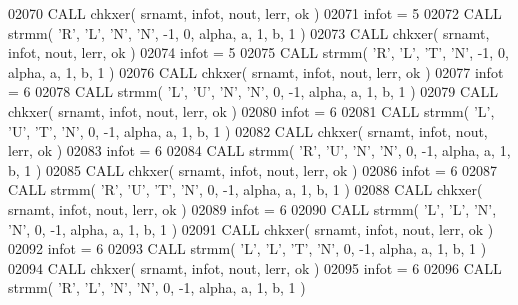 \begin{DoxyCode}
02070       \textcolor{keyword}{CALL }chkxer( srnamt, infot, nout, lerr, ok )
02071       infot = 5
02072       \textcolor{keyword}{CALL }strmm( \textcolor{stringliteral}{'R'}, \textcolor{stringliteral}{'L'}, \textcolor{stringliteral}{'N'}, \textcolor{stringliteral}{'N'}, -1, 0, alpha, a, 1, b, 1 )
02073       \textcolor{keyword}{CALL }chkxer( srnamt, infot, nout, lerr, ok )
02074       infot = 5
02075       \textcolor{keyword}{CALL }strmm( \textcolor{stringliteral}{'R'}, \textcolor{stringliteral}{'L'}, \textcolor{stringliteral}{'T'}, \textcolor{stringliteral}{'N'}, -1, 0, alpha, a, 1, b, 1 )
02076       \textcolor{keyword}{CALL }chkxer( srnamt, infot, nout, lerr, ok )
02077       infot = 6
02078       \textcolor{keyword}{CALL }strmm( \textcolor{stringliteral}{'L'}, \textcolor{stringliteral}{'U'}, \textcolor{stringliteral}{'N'}, \textcolor{stringliteral}{'N'}, 0, -1, alpha, a, 1, b, 1 )
02079       \textcolor{keyword}{CALL }chkxer( srnamt, infot, nout, lerr, ok )
02080       infot = 6
02081       \textcolor{keyword}{CALL }strmm( \textcolor{stringliteral}{'L'}, \textcolor{stringliteral}{'U'}, \textcolor{stringliteral}{'T'}, \textcolor{stringliteral}{'N'}, 0, -1, alpha, a, 1, b, 1 )
02082       \textcolor{keyword}{CALL }chkxer( srnamt, infot, nout, lerr, ok )
02083       infot = 6
02084       \textcolor{keyword}{CALL }strmm( \textcolor{stringliteral}{'R'}, \textcolor{stringliteral}{'U'}, \textcolor{stringliteral}{'N'}, \textcolor{stringliteral}{'N'}, 0, -1, alpha, a, 1, b, 1 )
02085       \textcolor{keyword}{CALL }chkxer( srnamt, infot, nout, lerr, ok )
02086       infot = 6
02087       \textcolor{keyword}{CALL }strmm( \textcolor{stringliteral}{'R'}, \textcolor{stringliteral}{'U'}, \textcolor{stringliteral}{'T'}, \textcolor{stringliteral}{'N'}, 0, -1, alpha, a, 1, b, 1 )
02088       \textcolor{keyword}{CALL }chkxer( srnamt, infot, nout, lerr, ok )
02089       infot = 6
02090       \textcolor{keyword}{CALL }strmm( \textcolor{stringliteral}{'L'}, \textcolor{stringliteral}{'L'}, \textcolor{stringliteral}{'N'}, \textcolor{stringliteral}{'N'}, 0, -1, alpha, a, 1, b, 1 )
02091       \textcolor{keyword}{CALL }chkxer( srnamt, infot, nout, lerr, ok )
02092       infot = 6
02093       \textcolor{keyword}{CALL }strmm( \textcolor{stringliteral}{'L'}, \textcolor{stringliteral}{'L'}, \textcolor{stringliteral}{'T'}, \textcolor{stringliteral}{'N'}, 0, -1, alpha, a, 1, b, 1 )
02094       \textcolor{keyword}{CALL }chkxer( srnamt, infot, nout, lerr, ok )
02095       infot = 6
02096       \textcolor{keyword}{CALL }strmm( \textcolor{stringliteral}{'R'}, \textcolor{stringliteral}{'L'}, \textcolor{stringliteral}{'N'}, \textcolor{stringliteral}{'N'}, 0, -1, alpha, a, 1, b, 1 )

\end{DoxyCode}

